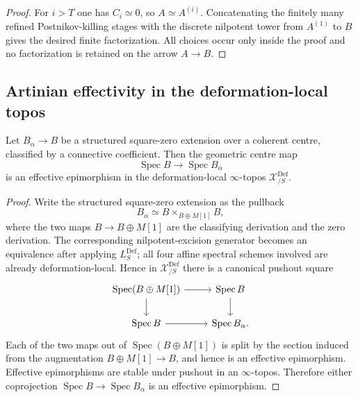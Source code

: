 \begin{proof}
For $i>T$ one has $C_i\simeq0$, so $A\simeq A^{(i)}$.  Concatenating the
finitely many refined Postnikov-killing stages with the discrete nilpotent
tower from $A^{(1)}$ to $B$ gives the desired finite factorization.  All
choices occur only inside the proof and no factorization is retained on the
arrow $A\to B$.
\end{proof}

\subsection{Artinian effectivity in the deformation-local topos}

\begin{lemma}
\label{lem:bnli-square-zero-def-effective}
Let $B_\alpha\to B$ be a structured square-zero extension over a coherent
centre, classified by a connective coefficient.  Then the geometric centre
map
\[
    \operatorname{Spec}B\longrightarrow\operatorname{Spec}B_\alpha
\]
is an effective epimorphism in the deformation-local $\infty$-topos
$\mathcal X^{\mathrm{Def}}_{/S}$.
\end{lemma}

\begin{proof}
Write the structured square-zero extension as the pullback
\[
    B_\alpha
    \simeq
    B\times_{B\oplus M[1]}B,
\]
where the two maps $B\to B\oplus M[1]$ are the classifying derivation and the
zero derivation.  The corresponding nilpotent-excision generator becomes an
equivalence after applying $L_S^{\mathrm{Def}}$; all four affine spectral
schemes involved are already deformation-local.  Hence in
$\mathcal X^{\mathrm{Def}}_{/S}$ there is a canonical pushout square
\[
\begin{tikzcd}
\operatorname{Spec}(B\oplus M[1]) \arrow[r] \arrow[d] &
\operatorname{Spec}B \arrow[d]\\
\operatorname{Spec}B \arrow[r] &
\operatorname{Spec}B_\alpha.
\end{tikzcd}
\]
Each of the two maps out of $\operatorname{Spec}(B\oplus M[1])$ is split by
the section induced from the augmentation $B\oplus M[1]\to B$, and hence is
an effective epimorphism.  Effective epimorphisms are stable under pushout in
an $\infty$-topos.  Therefore either coprojection
$\operatorname{Spec}B\to\operatorname{Spec}B_\alpha$ is an effective
epimorphism.
\end{proof}

